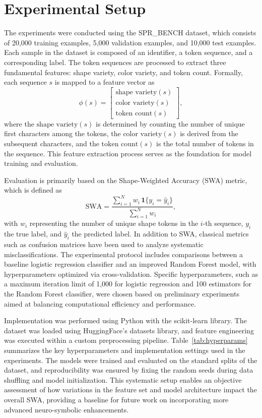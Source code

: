 \documentclass{article}
\begin{document}
\section{Experimental Setup}
The experiments were conducted using the SPR\_BENCH dataset, which consists of 20,000 training examples, 5,000 validation examples, and 10,000 test examples. Each sample in the dataset is composed of an identifier, a token sequence, and a corresponding label. The token sequences are processed to extract three fundamental features: shape variety, color variety, and token count. Formally, each sequence \( s \) is mapped to a feature vector as
\[
\phi(s) = \begin{bmatrix}
\text{shape variety}(s) \\
\text{color variety}(s) \\
\text{token count}(s)
\end{bmatrix},
\]
where the \(\text{shape variety}(s)\) is determined by counting the number of unique first characters among the tokens, the \(\text{color variety}(s)\) is derived from the subsequent characters, and the \(\text{token count}(s)\) is the total number of tokens in the sequence. This feature extraction process serves as the foundation for model training and evaluation.

Evaluation is primarily based on the Shape-Weighted Accuracy (SWA) metric, which is defined as
\[
\text{SWA} = \frac{\sum_{i=1}^N w_i\, \mathbf{1}\{y_i = \hat{y}_i\}}{\sum_{i=1}^N w_i},
\]
with \(w_i\) representing the number of unique shape tokens in the \(i\)-th sequence, \(y_i\) the true label, and \(\hat{y}_i\) the predicted label. In addition to SWA, classical metrics such as confusion matrices have been used to analyze systematic misclassifications. The experimental protocol includes comparisons between a baseline logistic regression classifier and an improved Random Forest model, with hyperparameters optimized via cross-validation. Specific hyperparameters, such as a maximum iteration limit of 1,000 for logistic regression and 100 estimators for the Random Forest classifier, were chosen based on preliminary experiments aimed at balancing computational efficiency and performance.

Implementation was performed using Python with the scikit-learn library. The dataset was loaded using HuggingFace's datasets library, and feature engineering was executed within a custom preprocessing pipeline. Table~\ref{tab:hyperparams} summarizes the key hyperparameters and implementation settings used in the experiments. The models were trained and evaluated on the standard splits of the dataset, and reproducibility was ensured by fixing the random seeds during data shuffling and model initialization. This systematic setup enables an objective assessment of how variations in the feature set and model architecture impact the overall SWA, providing a baseline for future work on incorporating more advanced neuro-symbolic enhancements.
\end{document}
